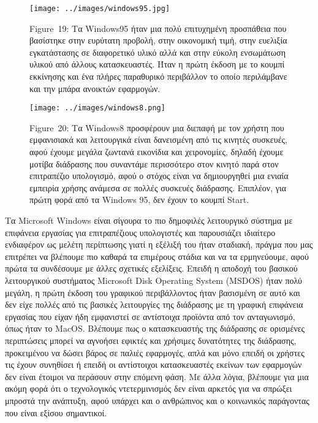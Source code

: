 \documentclass[
]{article}
\begin{document}
\leavevmode{}%
\begin{figure}
\hypertarget{fig:windows95}{%
\centering
\texttt{[image: ../images/windows95.jpg]}
\caption{Figure~19: Τα Windows95 ήταν μια πολύ επιτυχημένη προσπάθεια
που βασίστηκε στην ευρύτατη προβολή, στην οικονομική τιμή, στην ευελιξία
εγκατάστασης σε διαφορετικό υλικό αλλά και στην εύκολη ενσωμάτωση υλικού
από άλλους κατασκευαστές. Ήταν η πρώτη έκδοση με το κουμπί εκκίνησης και
ένα πλήρες παραθυρικό περιβάλλον το οποίο περιλάμβανε και την μπάρα
ανοικτών εφαρμογών.}\label{fig:windows95}
}
\end{figure}

\leavevmode{}%
\begin{figure}
\hypertarget{fig:windows8}{%
\centering
\texttt{[image: ../images/windows8.png]}
\caption{Figure~20: Τα Windows8 προσφέρουν μια διεπαφή με τον χρήστη που
εμφανισιακά και λειτουργικά είναι δανεισμένη από τις κινητές συσκευές,
αφού έχουμε μεγάλα ζωντανά εικονίδια και χειρονομίες, δηλαδή έχουμε
μοτίβα διάδρασης που συναντάμε περισσότερο στον κινητό παρά στον
επιτραπέζιο υπολογισμό, αφού ο στόχος είναι να δημιουργηθεί μια ενιαία
εμπειρία χρήσης ανάμεσα σε πολλές συσκευές διάδρασης. Επιπλέον, για
πρώτη φορά από τα Windows 95, δεν έχουν το κουμπί
Start.}\label{fig:windows8}
}
\end{figure}

Τα Microsoft Windows είναι σίγουρα το πιο δημοφιλές λειτουργικό σύστημα
με επιφάνεια εργασίας για επιτραπέζιους υπολογιστές και παρουσιάζει
ιδιαίτερο ενδιαφέρον ως μελέτη περίπτωσης γιατί η εξέλιξή του ήταν
σταδιακή, πράγμα που μας επιτρέπει να βλέπουμε πιο καθαρά τα επιμέρους
στάδια και να τα ερμηνεύουμε, αφού πρώτα τα συνδέσουμε με άλλες σχετικές
εξελίξεις. Επειδή η αποδοχή του βασικού λειτουργικού συστήματος
Microsoft Disk Operating System (MSDOS) ήταν πολύ μεγάλη, η πρώτη έκδοση
του γραφικού περιβάλλοντος ήταν βασισμένη σε αυτό και δεν είχε πολλές
από τις βασικές λειτουργίες της διάδρασης με τη γραφική επιφάνεια
εργασίας που είχαν ήδη εμφανιστεί σε αντίστοιχα προϊόντα από τον
ανταγωνισμό, όπως ήταν το MacOS. Βλέπουμε πως ο κατασκευαστής της
διάδρασης σε ορισμένες περιπτώσεις μπορεί να αγνοήσει εφικτές και
χρήσιμες δυνατότητες της διάδρασης, προκειμένου να δώσει βάρος σε παλιές
εφαρμογές, απλά και μόνο επειδή οι χρήστες τις έχουν συνηθίσει ή επειδή
οι αντίστοιχοι κατασκευαστές εκείνων των εφαρμογών δεν είναι έτοιμοι να
περάσουν στην επόμενη φάση. Με άλλα λόγια, βλέπουμε για μια ακόμη φορά
ότι ο τεχνολογικός ντετερμινισμός δεν είναι αρκετός για να σπρώξει
μπροστά την ανάπτυξη, αφού υπάρχει και ο ανθρώπινος και ο κοινωνικός
παράγοντας που είναι εξίσου σημαντικοί.
\end{document}
